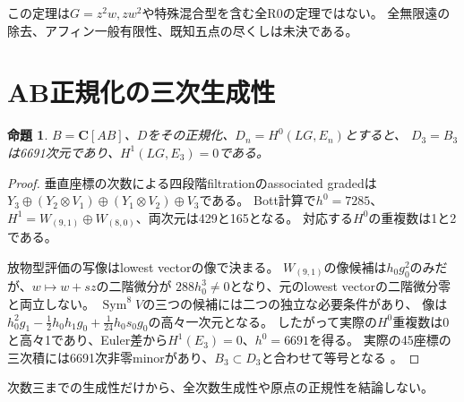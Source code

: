 \documentclass[11pt,a4paper]{ltjsarticle}
\newcommand{\CC}{\mathbf C}
\newtheorem{proposition}[theorem]{命題}
\theoremstyle{remark}
\begin{document}
この定理は$G=z^2w,zw^2$や特殊混合型を含む全R0の定理ではない。
全無限遠の除去、アフィン一般有限性、既知五点の尽くしは未決である。

\section{AB正規化の三次生成性}

\begin{proposition}
$B=\CC[AB]$、$D$をその正規化、$D_n=H^0(LG,E_n)$とすると、
$D_3=B_3$は6691次元であり、$H^1(LG,E_3)=0$である。
\end{proposition}
\begin{proof}
垂直座標の次数による四段階filtrationのassociated gradedは
$Y_3\oplus(Y_2\otimes V_1)\oplus(Y_1\otimes V_2)\oplus V_3$である。
Bott計算で$h^0=7285$、$H^1=W_{(9,1)}\oplus W_{(8,0)}$、両次元は429と165となる。
対応する$H^0$の重複数は1と2である。

放物型評価の写像はlowest vectorの像で決まる。
$W_{(9,1)}$の像候補は$h_0g_0^2$のみだが、$w\mapsto w+sz$の二階微分が
$288h_0^3\ne0$となり、元のlowest vectorの二階微分零と両立しない。
$\operatorname{Sym}^8V$の三つの候補には二つの独立な必要条件があり、
像は$h_0^2g_1-\frac12h_0h_1g_0+\frac1{24}h_0s_0g_0$の高々一次元となる。
したがって実際の$H^0$重複数は0と高々1であり、Euler差から$H^1(E_3)=0$、$h^0=6691$を得る。
実際の45座標の三次積には6691次非零minorがあり、$B_3\subset D_3$と合わせて等号となる
\cite{ab-degree3-v37}。
\end{proof}

次数三までの生成性だけから、全次数生成性や原点の正規性を結論しない。
\end{document}
